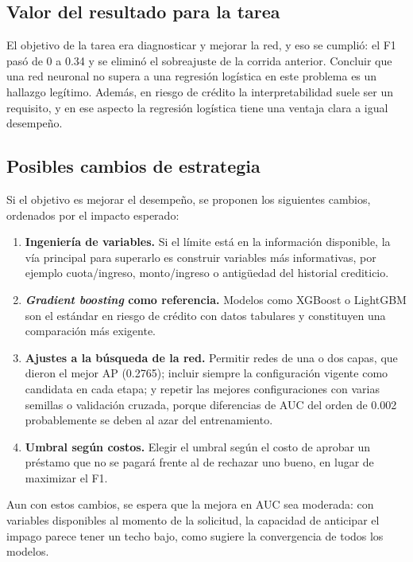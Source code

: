 \documentclass[12pt,a4paper]{article}
\begin{document}
\subsection{Valor del resultado para la tarea}

El objetivo de la tarea era diagnosticar y mejorar la red, y eso se cumplió: el F1 pasó de 0 a 0.34 y se eliminó el sobreajuste de la corrida anterior. Concluir que una red neuronal no supera a una regresión logística en este problema es un hallazgo legítimo. Además, en riesgo de crédito la interpretabilidad suele ser un requisito, y en ese aspecto la regresión logística tiene una ventaja clara a igual desempeño.

\subsection{Posibles cambios de estrategia}

Si el objetivo es mejorar el desempeño, se proponen los siguientes cambios, ordenados por el impacto esperado:

\begin{enumerate}
\item \textbf{Ingeniería de variables.} Si el límite está en la información disponible, la vía principal para superarlo es construir variables más informativas, por ejemplo cuota/ingreso, monto/ingreso o antigüedad del historial crediticio.
\item \textbf{\textit{Gradient boosting} como referencia.} Modelos como XGBoost o LightGBM son el estándar en riesgo de crédito con datos tabulares y constituyen una comparación más exigente.
\item \textbf{Ajustes a la búsqueda de la red.} Permitir redes de una o dos capas, que dieron el mejor AP (0.2765); incluir siempre la configuración vigente como candidata en cada etapa; y repetir las mejores configuraciones con varias semillas o validación cruzada, porque diferencias de AUC del orden de 0.002 probablemente se deben al azar del entrenamiento.
\item \textbf{Umbral según costos.} Elegir el umbral según el costo de aprobar un préstamo que no se pagará frente al de rechazar uno bueno, en lugar de maximizar el F1.
\end{enumerate}

Aun con estos cambios, se espera que la mejora en AUC sea moderada: con variables disponibles al momento de la solicitud, la capacidad de anticipar el impago parece tener un techo bajo, como sugiere la convergencia de todos los modelos.
\end{document}
